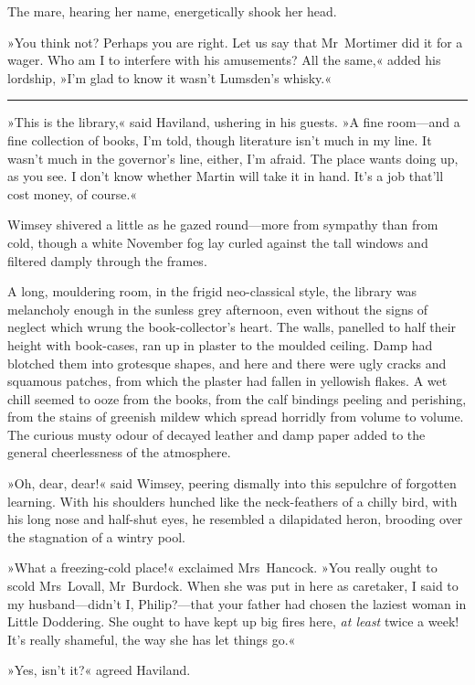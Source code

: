 The mare, hearing her name, energetically shook her head.

»You think not? Perhaps you are right. Let us say that Mr~Mortimer did it for a wager. Who am I to interfere with his amusements? All the same,« added his lordship, »I'm glad to know it wasn't Lumsden's whisky.«

\noindent\hfil\rule{0.5\textwidth}{.4pt}\hfil 

»This is the library,« said Haviland, ushering in his guests. »A fine room—and a fine collection of books, I'm told, though literature isn't much in my line. It wasn't much in the governor's line, either, I'm afraid. The place wants doing up, as you see. I don't know whether Martin will take it in hand. It's a job that'll cost money, of course.«

Wimsey shivered a little as he gazed round—more from sympathy than from cold, though a white November fog lay curled against the tall windows and filtered damply through the frames.

A long, mouldering room, in the frigid neo-classical style, the library was melancholy enough in the sunless grey afternoon, even without the signs of neglect which wrung the book-collector's heart. The walls, panelled to half their height with book-cases, ran up in plaster to the moulded ceiling. Damp had blotched them into grotesque shapes, and here and there were ugly cracks and squamous patches, from which the plaster had fallen in yellowish flakes. A wet chill seemed to ooze from the books, from the calf bindings peeling and perishing, from the stains of greenish mildew which spread horridly from volume to volume. The curious musty odour of decayed leather and damp paper added to the general cheerlessness of the atmosphere.

»Oh, dear, dear!« said Wimsey, peering dismally into this sepulchre of forgotten learning. With his shoulders hunched like the neck-feathers of a chilly bird, with his long nose and half-shut eyes, he resembled a dilapidated heron, brooding over the stagnation of a wintry pool.

»What a freezing-cold place!« exclaimed Mrs~Hancock. »You really ought to scold Mrs~Lovall, Mr~Burdock. When she was put in here as caretaker, I said to my husband—didn't I, Philip?—that your father had chosen the laziest woman in Little Doddering. She ought to have kept up big fires here, \textit{at least} twice a week! It's really shameful, the way she has let things go.«

»Yes, isn't it?« agreed Haviland.

